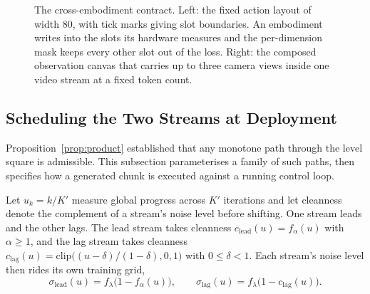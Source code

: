 \begin{figure}[t]
{}
\caption{The cross-embodiment contract. Left: the fixed action layout of width
80, with tick marks giving slot boundaries. An embodiment writes into the slots
its hardware measures and the per-dimension mask keeps every other slot out of
the loss. Right: the composed observation canvas that carries up to three camera
views inside one video stream at a fixed token count.}
\label{fig:contract}
\end{figure}

\subsection{Scheduling the Two Streams at Deployment}
\label{sec:deploy}

Proposition~\ref{prop:product} established that any monotone path through the level square
is admissible. This subsection parameterises a family of such paths, then
specifies how a generated chunk is executed against a running control loop.

Let $u_k = k / K'$ measure global progress across $K'$ iterations and let
cleanness denote the complement of a stream's noise level before shifting. One
stream leads and the other lags. The lead stream takes cleanness
$c_{\text{lead}}(u) = f_\alpha(u)$ with $\alpha \geq 1$, and the lag stream takes
cleanness $c_{\text{lag}}(u) = \mathrm{clip}\big((u - \delta) / (1 - \delta), 0, 1\big)$
with $0 \leq \delta < 1$. Each stream's noise level then rides its own training
grid,
\begin{equation}
  \sigma_{\text{lead}}(u) = f_{\lambda}\!\big(1 - f_\alpha(u)\big),
  \qquad
  \sigma_{\text{lag}}(u) = f_{\lambda}\!\big(1 - c_{\text{lag}}(u)\big).
  \label{eq:traj}
\end{equation}

